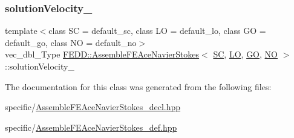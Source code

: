 \mbox{\label{classFEDD_1_1AssembleFEAceNavierStokes_abc56761fd3df5841f8f906d0bdccee16}} 
\subsubsection{\texorpdfstring{solution\+Velocity\+\_\+}{solutionVelocity\_}}
{\footnotesize\ttfamily template$<$class SC  = default\+\_\+sc, class LO  = default\+\_\+lo, class GO  = default\+\_\+go, class NO  = default\+\_\+no$>$ \\
vec\+\_\+dbl\+\_\+\+Type \hyperlink{classFEDD_1_1AssembleFEAceNavierStokes}{F\+E\+D\+D\+::\+Assemble\+F\+E\+Ace\+Navier\+Stokes}$<$ \hyperlink{fe__test__laplace_8cpp_a79c7e86a57edbb2a5a53242bcd04e41e}{SC}, \hyperlink{fe__test__laplace_8cpp_ad6a38c9f07d3fd633eefca5bccad8410}{LO}, \hyperlink{fe__test__laplace_8cpp_afa2946b509009b4f45eb04bd8c5b27d9}{GO}, \hyperlink{fe__test__laplace_8cpp_a5e24f37b28787429872b6ecb1d0417ce}{NO} $>$\+::solution\+Velocity\+\_\+\hspace{0.3cm}{\ttfamily [private]}}



The documentation for this class was generated from the following files\+:\begin{DoxyCompactItemize}
\item 
specific/\hyperlink{AssembleFEAceNavierStokes__decl_8hpp}{Assemble\+F\+E\+Ace\+Navier\+Stokes\+\_\+decl.\+hpp}\item 
specific/\hyperlink{AssembleFEAceNavierStokes__def_8hpp}{Assemble\+F\+E\+Ace\+Navier\+Stokes\+\_\+def.\+hpp}\end{DoxyCompactItemize}
